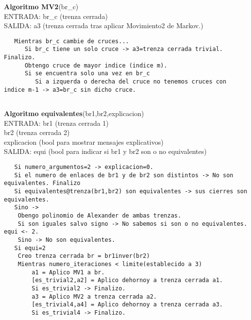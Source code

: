 \begin{alg}
	\textbf{Algoritmo MV2}(br\_c)\\
	ENTRADA: br\_c (trenza cerrada)\\
	SALIDA: \hspace{0.4cm} a3 (trenza cerrada tras aplicar Movimiento2 de Markov.) 
	
\begin{lstlisting}
   Mientras br_c cambie de cruces...
      Si br_c tiene un solo cruce -> a3=trenza cerrada trivial. Finalizo.
      Obtengo cruce de mayor indice (indice m). 
      Si se encuentra solo una vez en br_c
         Si a izquerda o derecha del cruce no tenemos cruces con indice m-1 -> a3=br_c sin dicho cruce.
         
\end{lstlisting}
\end{alg}

\begin{alg}
	\textbf{Algoritmo equivalentes}(br1,br2,explicacion)\\
	ENTRADA: br1 (trenza cerrada 1)\\
	\hspace*{2.2cm} br2 (trenza cerrada 2)\\
	\hspace*{2.2cm} explicacion (bool para mostrar mensajes explicativos)\\
	SALIDA: \hspace{0.4cm} equi (bool para indicar si br1 y br2 son o no equivalentes)
	
\begin{lstlisting}
   Si numero_argumentos=2 -> explicacion=0.
   Si el numero de enlaces de br1 y de br2 son distintos -> No son equivalentes. Finalizo
   Si equivalentes@trenza(br1,br2) son equivalentes -> sus cierres son equivalentes.
   Sino ->   
   	Obengo polinomio de Alexander de ambas trenzas.
	Si son iguales salvo signo -> No sabemos si son o no equivalentes. equi <- 2.
	Sino -> No son equivalentes.
   Si equi=2
    Creo trenza cerrada br = br1inver(br2)
    Mientras numero_iteraciones < limite(establecido a 3)
	    a1 = Aplico MV1 a br.
	    [es_trivial2,a2] = Aplico dehornoy a trenza cerrada a1. 
	    Si es_trivial2 -> Finalizo.
	    a3 = Aplico MV2 a trenza cerrada a2.
	    [es_trivial4,a4] = Aplico dehornoy a trenza cerrada a3. 
	    Si es_trivial4 -> Finalizo.
	   
\end{lstlisting}
\end{alg}


